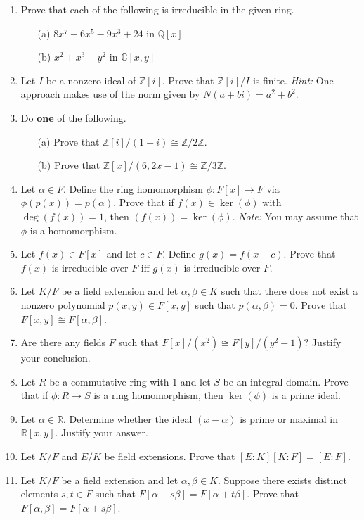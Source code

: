 \documentclass[11pt]{scrartcl}
\theoremstyle{definition}
\begin{document}
\begin{enumerate}

\item Prove that each of the following is irreducible in the given ring.
\begin{enumerate}
\item[(a)] $8x^7+6x^5-9x^3+24$ in $\mathbb{Q}[x]$
\item[(b)] $x^2+x^3-y^2$ in $\mathbb{C}[x,y]$
\end{enumerate}

\item Let $I$ be a nonzero ideal of $\mathbb{Z}[i]$.  Prove that $\mathbb{Z}[i]/I$ is finite. \emph{Hint:} One approach makes use of the norm given by $N(a+bi)=a^2+b^2$. 

\item Do \textbf{one} of the following.
\begin{enumerate}
\item[(a)] Prove that $\mathbb{Z}[i]/(1+i)\cong \mathbb{Z}/2\mathbb{Z}$.
\item[(b)] Prove that $\mathbb{Z}[x]/(6,2x-1)\cong \mathbb{Z}/3\mathbb{Z}$.
\end{enumerate}

\item Let $\alpha\in F$.  Define the ring homomorphism $\phi:F[x]\to F$ via $\phi(p(x))=p(\alpha)$.  Prove that if $f(x)\in\ker(\phi)$ with $\deg(f(x))=1$, then $(f(x))=\ker(\phi)$. \emph{Note:} You may assume that $\phi$ is a homomorphism.

\item Let $f(x)\in F[x]$ and let $c\in F$. Define $g(x)=f(x-c)$. Prove that $f(x)$ is irreducible over $F$ iff $g(x)$ is irreducible over $F$.

\item Let $K/F$ be a field extension and let $\alpha,\beta\in K$ such that there does not exist a nonzero polynomial $p(x,y)\in F[x,y]$ such that $p(\alpha,\beta)=0$.  Prove that $F[x,y]\cong F[\alpha,\beta]$.

\item Are there any fields $F$ such that $F[x]/(x^2)\cong F[y]/(y^2-1)$?  Justify your conclusion.

\item Let $R$ be a commutative ring with 1 and let $S$ be an integral domain.  Prove that if $\phi:R\to S$ is a ring homomorphism, then $\ker(\phi)$ is a prime ideal.

\item Let $\alpha\in \mathbb{R}$. Determine whether the ideal $(x-\alpha)$ is prime or maximal in $\mathbb{R}[x,y]$.  Justify your answer.

\item Let $K/F$ and $E/K$ be field extensions. Prove that $[E:K][K:F]=[E:F]$.

\item Let $K/F$ be a field extension and let $\alpha,\beta\in K$.  Suppose there exists distinct elements $s,t\in F$ such that $F[\alpha+s\beta]=F[\alpha+t\beta]$. Prove that $F[\alpha,\beta]=F[\alpha+s\beta]$.

\end{enumerate}
\end{document}
